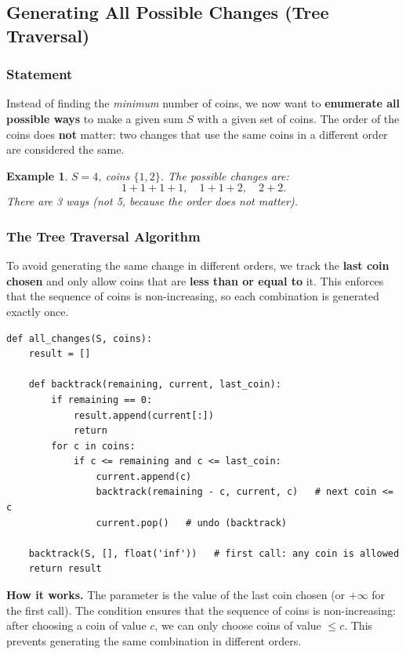 \documentclass[11pt,a4paper]{article}
\newtheorem{example}[theorem]{Example}
\newcommand{\code}[1]{\texttt{\detokenize{#1}}}
\begin{document}
\subsection{Generating All Possible Changes (Tree Traversal)}

\subsubsection{Statement}

Instead of finding the \emph{minimum} number of coins, we now want to \textbf{enumerate all possible ways} to make a given sum \( S \) with a given set of coins. The order of the coins does \textbf{not} matter: two changes that use the same coins in a different order are considered the same.

\begin{example}
\( S = 4 \), coins \( \{1, 2\} \). The possible changes are:
\[
1+1+1+1, \quad 1+1+2, \quad 2+2.
\]
There are 3 ways (not 5, because the order does not matter).
\end{example}

\subsubsection{The Tree Traversal Algorithm}

To avoid generating the same change in different orders, we track the \textbf{last coin chosen} and only allow coins that are \textbf{less than or equal to} it. This enforces that the sequence of coins is non-increasing, so each combination is generated exactly once.

\begin{lstlisting}
def all_changes(S, coins):
    result = []

    def backtrack(remaining, current, last_coin):
        if remaining == 0:
            result.append(current[:])
            return
        for c in coins:
            if c <= remaining and c <= last_coin:
                current.append(c)
                backtrack(remaining - c, current, c)   # next coin <= c
                current.pop()   # undo (backtrack)

    backtrack(S, [], float('inf'))   # first call: any coin is allowed
    return result
\end{lstlisting}

\textbf{How it works.} The parameter \code{last\_coin} is the value of the last coin chosen (or \(+\infty\) for the first call). The condition \code{c <= last\_coin} ensures that the sequence of coins is non-increasing: after choosing a coin of value \(c\), we can only choose coins of value \(\leq c\). This prevents generating the same combination in different orders.
\end{document}
